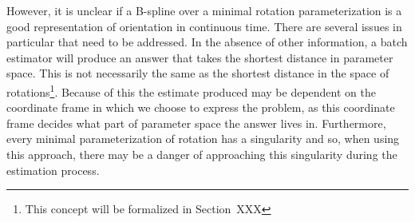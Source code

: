 \documentclass[11pt,a4paper,oneside]{article}
\begin{document}
However, it is unclear if a B-spline over a minimal rotation parameterization is a good representation of orientation in continuous time. There are several issues in particular that need to be addressed. In the absence of other information, a batch estimator will produce an answer that takes the shortest distance in parameter space. This is not necessarily the same as the shortest distance in the space of rotations\footnote{This concept will be formalized in Section~XXX}. Because of this the estimate produced may be dependent on the coordinate frame in which we choose to express the problem, as this coordinate frame decides what part of parameter space the answer lives in. Furthermore, every minimal parameterization of rotation has a singularity and so, when using this approach, there may be a danger of approaching this singularity during the estimation process.
\end{document}
